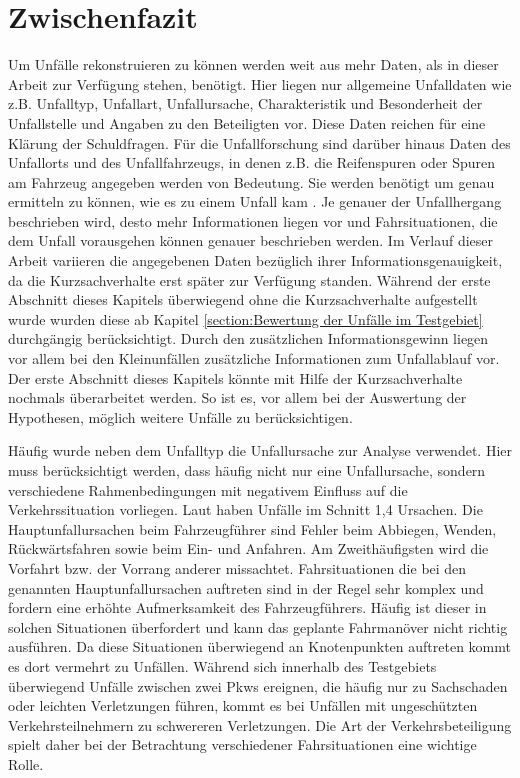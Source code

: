 \section{Zwischenfazit}
Um Unfälle rekonstruieren zu können werden weit aus mehr Daten, als in dieser Arbeit zur Verfügung stehen, benötigt. Hier liegen nur allgemeine Unfalldaten wie z.B. Unfalltyp, Unfallart, Unfallursache, Charakteristik und Besonderheit der Unfallstelle und Angaben zu den Beteiligten vor. Diese Daten reichen für eine Klärung der Schuldfragen. Für die Unfallforschung sind darüber hinaus Daten des Unfallorts und des Unfallfahrzeugs, in denen z.B. die Reifenspuren oder Spuren am Fahrzeug angegeben werden von Bedeutung. Sie werden benötigt um genau ermitteln zu können, wie es zu einem Unfall kam \parencite[S. 28]{Burg.2017}. Je genauer der Unfallhergang beschrieben wird, desto mehr Informationen liegen vor und Fahrsituationen, die dem Unfall vorausgehen können genauer beschrieben werden. Im Verlauf dieser Arbeit variieren die angegebenen Daten bezüglich ihrer Informationsgenauigkeit, da die Kurzsachverhalte erst später zur Verfügung standen. Während der erste Abschnitt dieses Kapitels überwiegend ohne die Kurzsachverhalte aufgestellt wurde wurden diese ab Kapitel \ref{section:Bewertung der Unfälle im Testgebiet} durchgängig berücksichtigt. Durch den zusätzlichen Informationsgewinn liegen vor allem bei den Kleinunfällen zusätzliche Informationen zum Unfallablauf vor. Der erste Abschnitt dieses Kapitels könnte mit Hilfe der Kurzsachverhalte nochmals überarbeitet werden. So ist es, vor allem bei der Auswertung der Hypothesen, möglich weitere Unfälle zu berücksichtigen.

Häufig wurde neben dem Unfalltyp die Unfallursache zur Analyse verwendet. Hier muss berücksichtigt werden, dass häufig nicht nur eine Unfallursache, sondern verschiedene Rahmenbedingungen mit negativem Einfluss auf die Verkehrssituation vorliegen. Laut \Textcite[S. 149]{StatistischesBundesamt.2016} haben Unfälle im Schnitt 1,4 Ursachen. Die Hauptunfallursachen beim Fahrzeugführer sind Fehler beim Abbiegen, Wenden, Rückwärtsfahren sowie beim Ein- und Anfahren. Am Zweithäufigsten wird die Vorfahrt bzw. der Vorrang anderer missachtet. Fahrsituationen die bei den genannten Hauptunfallursachen auftreten sind in der Regel sehr komplex und fordern eine erhöhte Aufmerksamkeit des Fahrzeugführers. Häufig ist dieser in solchen Situationen überfordert und kann das geplante Fahrmanöver nicht richtig ausführen. Da diese Situationen überwiegend an Knotenpunkten auftreten kommt es dort vermehrt zu Unfällen. Während sich innerhalb des Testgebiets überwiegend Unfälle zwischen zwei Pkws ereignen, die häufig nur zu Sachschaden oder leichten Verletzungen führen, kommt es bei Unfällen mit ungeschützten Verkehrsteilnehmern zu schwereren Verletzungen. Die Art der Verkehrsbeteiligung spielt daher bei der Betrachtung verschiedener Fahrsituationen eine wichtige Rolle.

